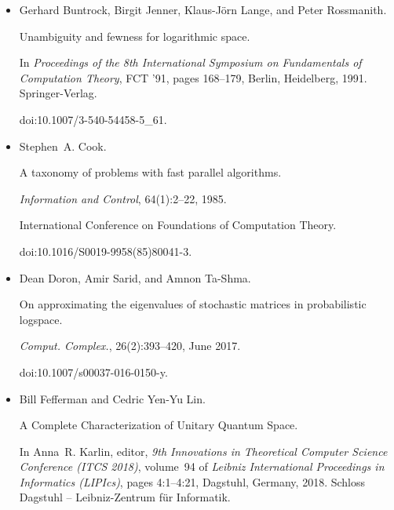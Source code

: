 \documentclass[10pt,a4paper]{article}
\begin{document}
\begin{itemize}
A sublinear space, polynomial time algorithm for directed s-t
connectivity.


\emph{SIAM Journal on Computing}, 27(5):1273–1282, 1998.


doi:10.1137/S0097539793283151.





\item[] 
[6]

Gerhard Buntrock, Birgit Jenner, Klaus-Jörn Lange, and Peter Rossmanith.


Unambiguity and fewness for logarithmic space.


In \emph{Proceedings of the 8th International Symposium on
Fundamentals of Computation Theory}, FCT ’91, pages 168–179, Berlin,
Heidelberg, 1991. Springer-Verlag.


doi:10.1007/3-540-54458-5\_61.





\item[] 
[7]

Stephen A. Cook.


A taxonomy of problems with fast parallel algorithms.


\emph{Information and Control}, 64(1):2–22, 1985.


International Conference on Foundations of Computation Theory.


doi:10.1016/S0019-9958(85)80041-3.





\item[] 
[8]

Dean Doron, Amir Sarid, and Amnon Ta-Shma.


On approximating the eigenvalues of stochastic matrices in
probabilistic logspace.


\emph{Comput. Complex.}, 26(2):393–420, June 2017.


doi:10.1007/s00037-016-0150-y.





\item[] 
[9]

Bill Fefferman and Cedric Yen-Yu Lin.


A Complete Characterization of Unitary Quantum Space.


In Anna R. Karlin, editor, \emph{9th Innovations in Theoretical
Computer Science Conference (ITCS 2018)}, volume 94 of \emph{Leibniz
International Proceedings in Informatics (LIPIcs)}, pages 4:1–4:21,
Dagstuhl, Germany, 2018. Schloss Dagstuhl – Leibniz-Zentrum für
Informatik.



\end{itemize}
\end{document}
